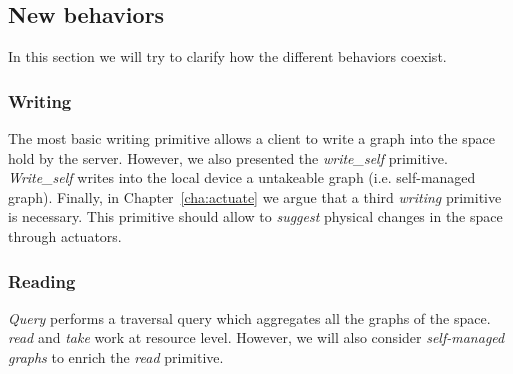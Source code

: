 \subsection{New behaviors}

In this section we will try to clarify how the different behaviors coexist.

\subsubsection{Writing}

The most basic writing primitive allows a client to write a graph into the space hold by the server.
However, we also presented the \emph{write\_self} primitive.
\emph{Write\_self} writes into the local device a untakeable graph (i.e. self-managed graph).
Finally, in Chapter~\ref{cha:actuate} we argue that a third \emph{writing} primitive is necessary.
This primitive should allow to \emph{suggest} physical changes in the space through actuators.


\subsubsection{Reading}

\emph{Query} performs a traversal query which aggregates all the graphs of the space.
\emph{read} and \emph{take} work at resource level.
However, we will also consider \emph{self-managed graphs} to enrich the \emph{read} primitive. %